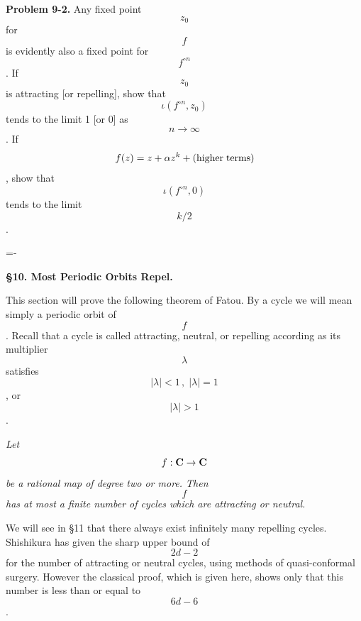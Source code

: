 {\bf Problem 9-2.} Any fixed point \[z_0\] for \[f\] is evidently also a
fixed point for \[f^{\circ n}\]. If \[z_0\] is attracting [or repelling],
show that \[\iota(f^{\circ n},z_0)\] tends to the limit 1 [or 0] as
\[n\to\infty\]. If \[\;f(z)=z+\alpha z^k+({\rm higher\;terms})\,\], show that
\[\iota(f^{\circ n},0)\] tends to the limit \[k/2\].

\vfil\eject %
\footline={\hss{}-\folio\hss}

\centerline{\bf \S10. Most Periodic Orbits Repel.}\bigskip

This section will prove the following theorem of Fatou. By a {\bit cycle}
we will mean simply a periodic orbit of \[f\]. Recall that a cycle is
called {\bit attracting}, {\bit neutral}, or {\bit repelling} according as its
multiplier \[\lambda\] satisfies \[|\lambda|<1\,,\;|\lambda|=1\], or
\[|\lambda|>1\].

{ {\it Let \[f:{\bf C}\to{\bf C}\] be a rational map
of degree two or more. Then \[f\] has at most a finite number of
cycles which are attracting or neutral.}\medskip}

We will see in \S11 that there always exist infinitely many repelling
cycles. Shishikura has given
the sharp upper bound of \[2d-2\] for the number of attracting or neutral
cycles, using methods of quasi-conformal surgery. However the classical
proof, which is given here, shows only that this number is less than
or equal to \[6d-6\].\smallskip

